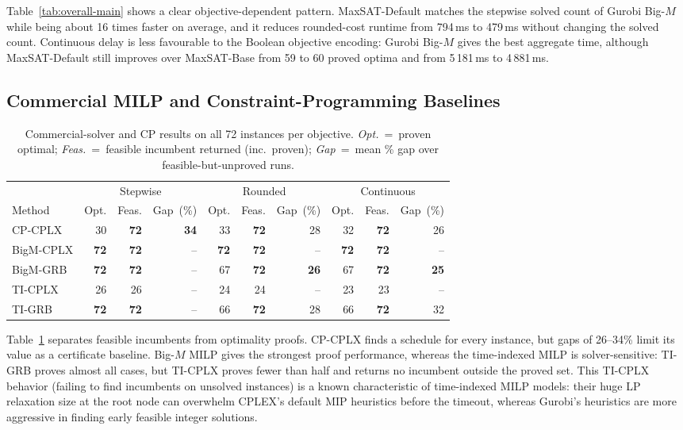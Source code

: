 \documentclass[runningheads]{llncs}
\begin{document}
Table~\ref{tab:overall-main} shows a clear objective-dependent pattern.
MaxSAT-Default matches the stepwise solved count of Gurobi Big-$M$ while being
about 16 times faster on average, and it reduces rounded-cost runtime from
794\,ms to 479\,ms without changing the solved count. Continuous delay is less
favourable to the Boolean objective encoding: Gurobi Big-$M$ gives the best
aggregate time, although MaxSAT-Default still improves over MaxSAT-Base from 59
to 60 proved optima and from 5\,181\,ms to 4\,881\,ms.

\subsection{Commercial MILP and Constraint-Programming Baselines}
\label{subsec:commercial-cplex}

\begin{table}
\centering
\caption{Commercial-solver and CP results on all 72 instances per objective. \emph{Opt.}~=~proven optimal; \emph{Feas.}~=~feasible incumbent returned (inc.\ proven); \emph{Gap}~=~mean \% gap over feasible-but-unproved runs.}
\label{tab:commercial-solvers}
\scriptsize
\setlength{\tabcolsep}{3.6pt}
\renewcommand{\arraystretch}{1.0}
\begin{tabular}{lrrrrrrrrr}
\toprule
& \multicolumn{3}{c}{Stepwise} & \multicolumn{3}{c}{Rounded} & \multicolumn{3}{c}{Continuous} \\
\cmidrule(lr){2-4}\cmidrule(lr){5-7}\cmidrule(lr){8-10}
Method & Opt. & Feas. & Gap~(\%) & Opt. & Feas. & Gap~(\%) & Opt. & Feas. & Gap~(\%) \\
\midrule
CP-CPLX & 30 & \textbf{72} & \textbf{34} & 33 & \textbf{72} & 28 & 32 & \textbf{72} & 26 \\
BigM-CPLX & \textbf{72} & \textbf{72} & -- & \textbf{72} & \textbf{72} & -- & \textbf{72} & \textbf{72} & -- \\
BigM-GRB & \textbf{72} & \textbf{72} & -- & 67 & \textbf{72} & \textbf{26} & 67 & \textbf{72} & \textbf{25} \\
TI-CPLX & 26 & 26 & -- & 24 & 24 & -- & 23 & 23 & -- \\
TI-GRB & \textbf{72} & \textbf{72} & -- & 66 & \textbf{72} & 28 & 66 & \textbf{72} & 32 \\
\bottomrule
\end{tabular}
\end{table}

Table~\ref{tab:commercial-solvers} separates feasible incumbents from
optimality proofs. CP-CPLX finds a schedule for every instance, but gaps of
26--34\% limit its value as a certificate baseline. Big-$M$ MILP gives the
strongest proof performance, whereas the time-indexed MILP is solver-sensitive:
TI-GRB proves almost all cases, but TI-CPLX proves fewer than half and returns
no incumbent outside the proved set. This TI-CPLX behavior (failing to find incumbents on unsolved instances) is a known characteristic of time-indexed MILP models: their huge LP relaxation size at the root node can overwhelm CPLEX's default MIP heuristics before the timeout, whereas Gurobi's heuristics are more aggressive in finding early feasible integer solutions.
\end{document}
